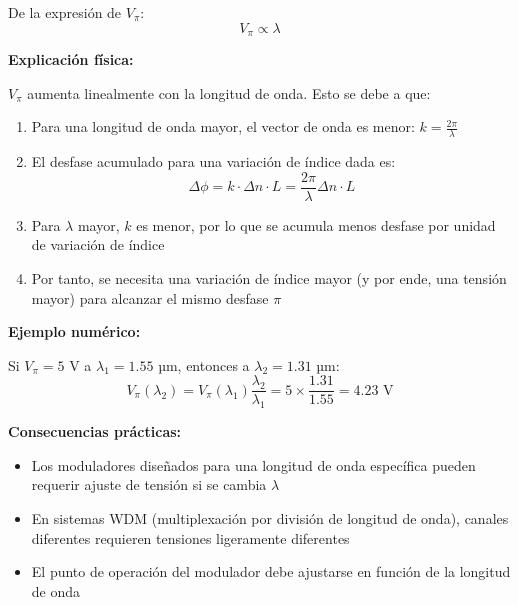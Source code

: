 \documentclass[12pt,a4paper]{article}
\begin{document}
\begin{enumerate}
De la expresión de $V_\pi$:
\begin{equation}
    V_\pi \propto \lambda
\end{equation}

\textbf{Explicación física:}

$V_\pi$ aumenta linealmente con la longitud de onda. Esto se debe a que:

\begin{enumerate}
    \item Para una longitud de onda mayor, el vector de onda es menor: $k = \frac{2\pi}{\lambda}$
    
    \item El desfase acumulado para una variación de índice dada es:
    \begin{equation}
        \Delta\phi = k \cdot \Delta n \cdot L = \frac{2\pi}{\lambda} \Delta n \cdot L
    \end{equation}
    
    \item Para $\lambda$ mayor, $k$ es menor, por lo que se acumula menos desfase por unidad de variación de índice
    
    \item Por tanto, se necesita una variación de índice mayor (y por ende, una tensión mayor) para alcanzar el mismo desfase $\pi$
\end{enumerate}

\textbf{Ejemplo numérico:}

Si $V_\pi = 5$ V a $\lambda_1 = 1.55$ µm, entonces a $\lambda_2 = 1.31$ µm:
\begin{equation}
    V_\pi(\lambda_2) = V_\pi(\lambda_1) \frac{\lambda_2}{\lambda_1} = 5 \times \frac{1.31}{1.55} = 4.23 \text{ V}
\end{equation}

\textbf{Consecuencias prácticas:}

\begin{itemize}
    \item Los moduladores diseñados para una longitud de onda específica pueden requerir ajuste de tensión si se cambia $\lambda$
    \item En sistemas WDM (multiplexación por división de longitud de onda), canales diferentes requieren tensiones ligeramente diferentes
    \item El punto de operación del modulador debe ajustarse en función de la longitud de onda
\end{itemize}


\end{enumerate}
\end{document}
